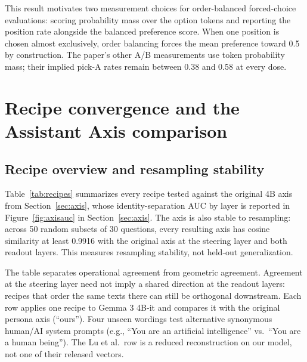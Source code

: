 This result motivates two measurement choices for order-balanced forced-choice
evaluations: scoring probability mass over the option tokens and reporting the
position rate alongside the balanced preference score. When one position is
chosen almost exclusively, order balancing forces the mean preference toward
0.5 by construction. The paper's other A/B measurements use token probability
mass; their implied pick-A rates remain between 0.38 and 0.58 at every dose.

\section{Recipe convergence and the Assistant Axis comparison}
\label{app:assistantaxis}

\subsection{Recipe overview and resampling stability}

Table~\ref{tab:recipes} summarizes every recipe tested against the original 4B
axis from Section~\ref{sec:axis}, whose identity-separation AUC by layer is
reported in Figure~\ref{fig:axisauc} in Section~\ref{sec:axis}. The axis is
also stable to resampling: across 50 random subsets of 30 questions, every
resulting axis has cosine similarity at least 0.9916 with the original axis at
the steering layer and both readout layers. This measures resampling
stability, not held-out generalization.

The table separates operational agreement from geometric agreement. Agreement
at the steering layer need not imply a shared direction at the readout layers:
recipes that order the same texts there can still be orthogonal downstream.
Each row applies one recipe to Gemma 3 4B-it and compares it with the original
persona axis (``ours''). Four unseen wordings test alternative synonymous human/AI
system prompts (e.g., ``You are an artificial intelligence'' vs.\ ``You are a human being'').
The Lu et al.\ row is a reduced reconstruction on our
model, not one of their released vectors.

